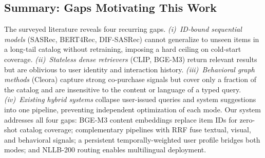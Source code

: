 \subsection{Summary: Gaps Motivating This Work}
The surveyed literature reveals four recurring gaps.
\textit{(i)~ID-bound sequential models} (SASRec, BERT4Rec, DIF-SASRec) cannot
generalize to unseen items in a long-tail catalog without retraining, imposing
a hard ceiling on cold-start coverage.
\textit{(ii)~Stateless dense retrievers} (CLIP, BGE-M3) return relevant results
but are oblivious to user identity and interaction history.
\textit{(iii)~Behavioral graph methods} (Cleora) capture strong co-purchase
signals but cover only a fraction of the catalog and are insensitive to the
content or language of a typed query.
\textit{(iv)~Existing hybrid systems} collapse user-issued queries and
system suggestions into one pipeline, preventing independent optimization
of each mode.
Our system addresses all four gaps: BGE-M3 content embeddings replace item
IDs for zero-shot catalog coverage; complementary pipelines with RRF fuse
textual, visual, and behavioral signals; a persistent temporally-weighted
user profile bridges both modes; and NLLB-200 routing enables multilingual
deployment.
